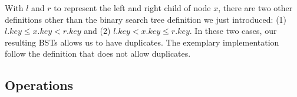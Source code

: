 \documentclass[main.tex]{subfiles}
\begin{document}


With $l$ and $r$ to represent the left and right child of node $x$,  there are two other definitions other than the binary search tree definition we just introduced:  (1)$l.key \leq x.key < r.key$ and (2) $l.key  < x.key \leq r.key$. In these two cases, our resulting BSTs allows us to have duplicates. The exemplary implementation follow the definition that does not allow duplicates.






\subsection{Operations}
\end{document}
